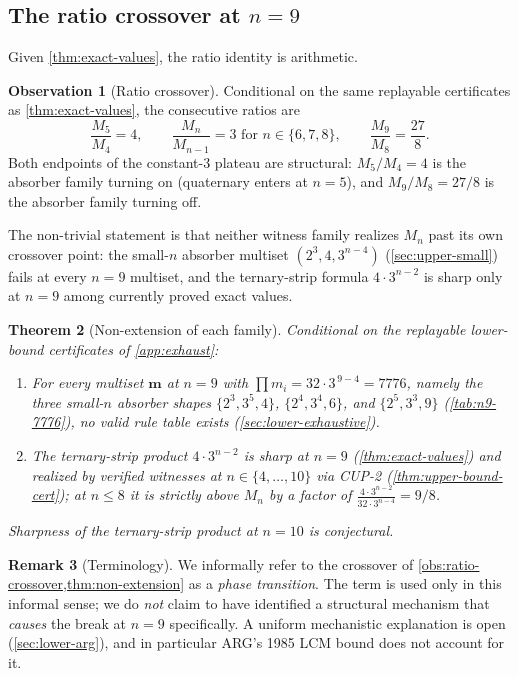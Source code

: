 \documentclass[11pt,a4paper]{article}
\theoremstyle{plain}
\newtheorem{theorem}{Theorem}
\theoremstyle{definition}
\newtheorem{remark}[theorem]{Remark}
\newtheorem{observation}[theorem]{Observation}
\newcommand{\Mn}{M_n}
\begin{document}
\subsection{The ratio crossover at $n = 9$}\label{sec:main-phase}

Given \cref{thm:exact-values}, the ratio
identity is arithmetic.

\begin{observation}[Ratio crossover]\label{obs:ratio-crossover}
Conditional on the same replayable certificates as
\cref{thm:exact-values}, the consecutive ratios are
\[
   \frac{M_5}{M_4} = 4, \qquad
   \frac{M_n}{M_{n-1}} = 3 \text{ for } n \in \{6, 7, 8\}, \qquad
   \frac{M_9}{M_8} = \frac{27}{8}.
\]
Both endpoints of the constant-$3$ plateau are structural: $M_5/M_4
= 4$ is the absorber family turning on (quaternary enters at
$n = 5$), and $M_9/M_8 = 27/8$ is the absorber family turning off.
\end{observation}

The non-trivial statement is that neither witness family realizes
$\Mn$ past its own crossover point: the small-$n$ absorber
multiset $(2^3, 4, 3^{n-4})$ (\cref{sec:upper-small}) fails at every
$n = 9$ multiset, and the ternary-strip formula $4 \cdot 3^{n-2}$
is sharp only at $n = 9$ among currently proved exact values.

\begin{theorem}[Non-extension of each family]\label{thm:non-extension}
Conditional on the replayable lower-bound certificates of
\cref{app:exhaust}:
\begin{enumerate}[leftmargin=*]
\item For every multiset $\mathbf{m}$ at $n = 9$ with $\prod m_i =
32 \cdot 3^{\,9-4} = 7776$, namely the three small-$n$
absorber shapes $\{2^3, 3^5, 4\}$, $\{2^4, 3^4, 6\}$, and
$\{2^5, 3^3, 9\}$ (\cref{tab:n9-7776}), no valid rule table
exists (\cref{sec:lower-exhaustive}).
\item The ternary-strip product $4 \cdot 3^{n-2}$ is sharp at
$n = 9$ (\cref{thm:exact-values}) and realized by verified
witnesses at $n \in \{4, \ldots, 10\}$ via CUP-2
(\cref{thm:upper-bound-cert}); at $n \le 8$
it is strictly above $\Mn$ by a factor of $\frac{4\cdot 3^{n-2}}{32\cdot 3^{n-4}} = 9/8$.
\end{enumerate}
Sharpness of the ternary-strip product at $n = 10$ is conjectural.
\end{theorem}

\begin{remark}[Terminology]\label{rem:phase-scope}
We informally refer to the crossover of
\cref{obs:ratio-crossover,thm:non-extension} as a \emph{phase
transition}.  The term is used only in this informal sense; we do
\emph{not} claim to have identified a structural mechanism that
\emph{causes} the break at $n = 9$ specifically.  A uniform
mechanistic explanation is open (\cref{sec:lower-arg}), and in
particular ARG's 1985 LCM bound does not account for it.
\end{remark}
\end{document}
